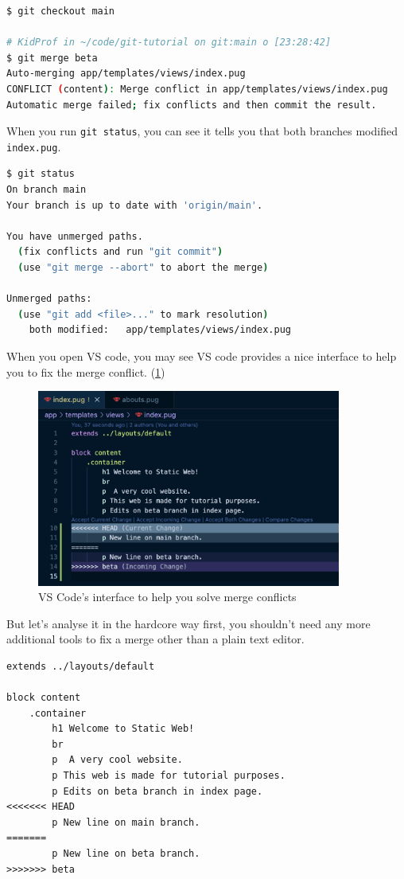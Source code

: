 \begin{lstlisting}[language=bash]
$ git checkout main

# KidProf in ~/code/git-tutorial on git:main o [23:28:42]
$ git merge beta
Auto-merging app/templates/views/index.pug
CONFLICT (content): Merge conflict in app/templates/views/index.pug
Automatic merge failed; fix conflicts and then commit the result.
\end{lstlisting}

When you run \texttt{git status}, you can see it tells you that both branches modified \texttt{index.pug}.

\begin{lstlisting}[language=bash]
$ git status
On branch main
Your branch is up to date with 'origin/main'.

You have unmerged paths.
  (fix conflicts and run "git commit")
  (use "git merge --abort" to abort the merge)

Unmerged paths:
  (use "git add <file>..." to mark resolution)
	both modified:   app/templates/views/index.pug
\end{lstlisting}

When you open VS code, you may see VS code provides a nice interface to help you to fix the merge conflict. (\cref{fig:vscodemergeconflict})

\begin{figure}[h]
\centering
\includegraphics[width=10cm]{images/ch8-merge-conflict-vscode.png}
\caption{VS Code's interface to help you solve merge conflicts}
\label{fig:vscodemergeconflict}
\end{figure}

But let's analyse it in the hardcore way first, you shouldn't need any more additional tools to fix a merge other than a plain text editor. 

\begin{lstlisting}[language=pug]
extends ../layouts/default

block content
	.container
		h1 Welcome to Static Web!
		br
		p  A very cool website.
		p This web is made for tutorial purposes.
		p Edits on beta branch in index page.
<<<<<<< HEAD
		p New line on main branch.
=======
		p New line on beta branch.
>>>>>>> beta
\end{lstlisting}


